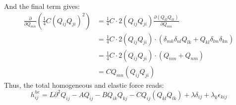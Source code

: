 \documentclass[reqno]{article}
\begin{document}
	And the final term gives:
	\begin{equation}
	\begin{split}
		\frac{\partial}{\partial Q_{mn}}\left( \frac{1}{4} C(Q_{ij}Q_{ji})^2 \right) &= \frac{1}{4}C \cdot 2(Q_{ij}Q_{ji}) \frac{\partial(Q_{kl}Q_{lk})}{\partial Q_{mn}} \\
		&= \frac{1}{4}C \cdot 2(Q_{ij}Q_{ji}) \cdot (\delta_{mk}\delta_{nl}Q_{lk} + Q_{kl}\delta_{lm}\delta_{kn}) \\
		&= \frac{1}{4}C \cdot 2(Q_{ij}Q_{ji}) \cdot (Q_{nm} + Q_{nm}) \\
		&= C Q_{mn} (Q_{ij}Q_{ji})
	\end{split}
	\end{equation}
	Thus, the total homogeneous and elastic force reads:
	\begin{equation}\label{eq:hom-el-force}
		h^{he}_{ij} = L\partial^2 Q_{ij} - A Q_{ij} - BQ_{ik}Q_{kj} - C Q_{ij} (Q_{kl}Q_{lk}) + \lambda\delta_{ij} + \lambda_k \epsilon_{kij}
	\end{equation}
	
\end{document}
